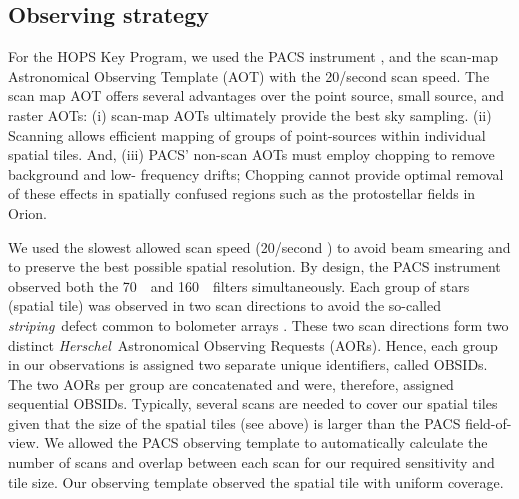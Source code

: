 \documentclass[manuscript]{aastex}
\newcommand{\herschel}{{\em Herschel}}
\begin{document}
\subsection{Observing strategy}
\label{sec:obs}
\par
For the HOPS Key Program, we used the PACS instrument \citep{pacs}, and the scan-map Astronomical Observing Template (AOT) with the 20\arcsec/second scan speed.  The scan map AOT offers several advantages over the point source, small source, and raster AOTs: (i) scan-map AOTs ultimately provide the best sky sampling.  (ii) Scanning allows efficient mapping of groups of point-sources within individual spatial tiles.  And, (iii) PACS' non-scan AOTs must employ chopping to remove background and low- frequency drifts; Chopping cannot provide optimal removal of these effects in spatially confused regions such as the protostellar fields in Orion.

\par
We used the slowest allowed scan speed (20\arcsec/second ) to avoid beam smearing and to preserve the best possible spatial resolution.   By design, the PACS instrument observed both the 70~\micron\ and 160~\micron\ filters simultaneously.  Each group of stars (spatial tile) was observed in two scan directions to avoid the so-called {\em striping}\ defect common to bolometer arrays \citep{boloref}.  These two scan directions form two distinct \herschel\ Astronomical Observing Requests (AORs).  Hence, each group in our observations is assigned two separate unique identifiers, called OBSIDs.  The two AORs per group are concatenated and were, therefore, assigned sequential OBSIDs.  Typically, several scans are needed to cover our spatial tiles given that the size of the spatial tiles (see above) is larger than the PACS field-of-view.  We allowed the PACS observing template to automatically calculate the number of scans and overlap between each scan for our required sensitivity and tile size.  Our observing template observed the spatial tile with uniform coverage.
\end{document}
